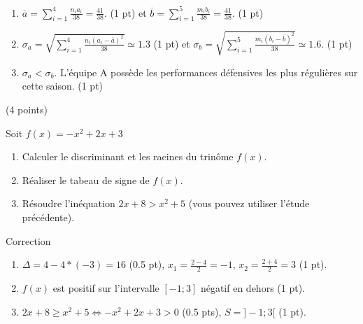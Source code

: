 \documentclass[a4paper,11pt]{article}
\theoremstyle{break}
\begin{document}
\begin{exo}
\begin{correction}

\begin{enumerate}
 \item $\overline{a}=\sum_{i=1}^4 \frac{n_i a_i}{38}=\frac{41}{38}$. (1 pt)
 et $\overline{b}=\sum_{i=1}^5 \frac{m_i b_i}{38}=\frac{41}{38}$. (1 pt)
 \item $\sigma_{a}=\sqrt{\sum_{i=1}^4 \frac{n_i (a_i-\overline{a})^2}{38}} \simeq 1.3$ (1 pt)
 et $\sigma_{b}=\sqrt{\sum_{i=1}^5 \frac{m_i (b_i-\overline{b})^2}{38}}\simeq 1.6$. (1 pt)
  \item $\sigma_a<\sigma_b$. L'\'equipe A poss\`ede les performances d\'efensives les plus r\' eguli\`eres sur cette saison. (1 pt)
\end{enumerate}

\end{correction}

\end{exo}
 
  
  \begin{exo}(4 points)
      
 Soit $f(x)=-x^2+2x+3$     
\begin{enumerate}
 \item Calculer le discriminant et les racines du trinôme $f(x)$.
 \item Réaliser le tabeau de signe de $f(x)$.
 \item Résoudre l'inéquation $2x+8 > x^2+5$ (vous pouvez utiliser l'étude précédente).
\end{enumerate}



\begin{correction}
Correction
\begin{enumerate}
 \item $\Delta=4-4*(-3)=16$ (0.5 pt), $x_1=\frac{2-4}{2}=-1$, $x_2=\frac{2+4}{2}=3$ (1 pt).
 \item $f(x)$ est positif sur l'intervalle $[-1;3]$ n\'egatif en dehors (1 pt).
 \item $2x+8 \geq x^2+5 \Leftrightarrow -x^2+2x+3 > 0$ (0.5 pts), $S=]-1;3[$ (1 pt).

\end{enumerate}

\end{correction}

\end{exo}
 ~
    
\end{document}
